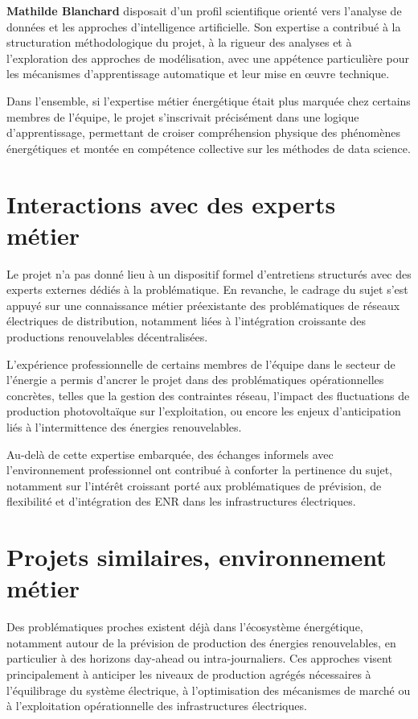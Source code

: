 \textbf{Mathilde Blanchard} disposait d’un profil scientifique orienté vers l’analyse de données et les approches
d’intelligence artificielle. Son expertise a contribué à la structuration méthodologique du projet, à la
rigueur des analyses et à l’exploration des approches de modélisation, avec une appétence particulière
pour les mécanismes d’apprentissage automatique et leur mise en œuvre technique.

Dans l’ensemble, si l’expertise métier énergétique était plus marquée chez certains membres de
l’équipe, le projet s’inscrivait précisément dans une logique d’apprentissage, permettant de croiser
compréhension physique des phénomènes énergétiques et montée en compétence collective sur les
méthodes de data science.

\section{Interactions avec des experts métier}

Le projet n’a pas donné lieu à un dispositif formel d’entretiens structurés avec des experts externes
dédiés à la problématique. En revanche, le cadrage du sujet s’est appuyé sur une connaissance métier
préexistante des problématiques de réseaux électriques de distribution, notamment liées à l’intégration
croissante des productions renouvelables décentralisées.

L’expérience professionnelle de certains membres de l’équipe dans le secteur de l’énergie a permis
d’ancrer le projet dans des problématiques opérationnelles concrètes, telles que la gestion des
contraintes réseau, l’impact des fluctuations de production photovoltaïque sur l’exploitation, ou encore
les enjeux d’anticipation liés à l’intermittence des énergies renouvelables.

Au-delà de cette expertise embarquée, des échanges informels avec l’environnement professionnel ont
contribué à conforter la pertinence du sujet, notamment sur l’intérêt croissant porté aux problématiques
de prévision, de flexibilité et d’intégration des ENR dans les infrastructures électriques.

\clearpage

\section{Projets similaires, environnement métier}

Des problématiques proches existent déjà dans l’écosystème énergétique, notamment autour de la
prévision de production des énergies renouvelables, en particulier à des horizons day-ahead ou
intra-journaliers. Ces approches visent principalement à anticiper les niveaux de production agrégés
nécessaires à l’équilibrage du système électrique, à l’optimisation des mécanismes de marché ou à
l’exploitation opérationnelle des infrastructures électriques.

